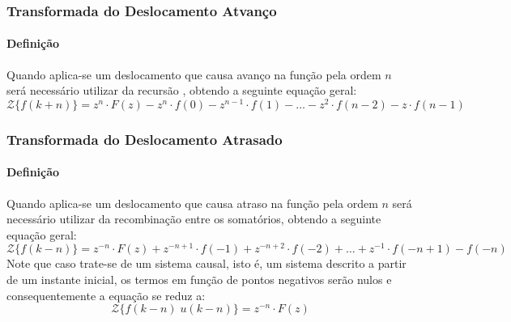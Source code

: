 \documentclass{article}
\begin{document}
\subsubsection{Transformada do Deslocamento Atvanço}
    \paragraph{Definição}Quando aplica-se um deslocamento que causa avanço na função pela ordem $n$ será necessário utilizar da recursão , obtendo a seguinte equação geral:
    \begin{equation}
        \boxed{
            \mathcal{Z}\{ f(k+n) \} = 
            z^{n}\cdot F(z) - 
            z^{n} \cdot f(0) - 
            z^{n-1} \cdot f(1) - \dots - 
            z^{2} \cdot f(n-2) - 
            z\cdot f(n-1)
        }
    \end{equation}

\subsubsection{Transformada do Deslocamento Atrasado}
    \paragraph{Definição}Quando aplica-se um deslocamento que causa atraso na função pela ordem $n$ será necessário utilizar da recombinação entre os somatórios, obtendo a seguinte equação geral:
    \begin{equation}
        \boxed{
            \mathcal{Z}\{ f(k-n) \} = 
            z^{-n}\cdot F(z) + 
            z^{-n+1}\cdot f(-1) + 
            z^{-n+2}\cdot f(-2) + \dots + 
            z^{-1}\cdot f(-n+1) - 
            f(-n)
        }
    \end{equation}
    Note que caso trate-se de um sistema causal, isto é, um sistema descrito a partir de um instante inicial, os termos em função de pontos negativos serão nulos e consequentemente a equação se reduz a:
    \begin{equation*}
        \mathcal{Z}\{ f(k-n) \; u(k-n)\} = z^{-n}\cdot F(z) 
    \end{equation*}
\end{document}
